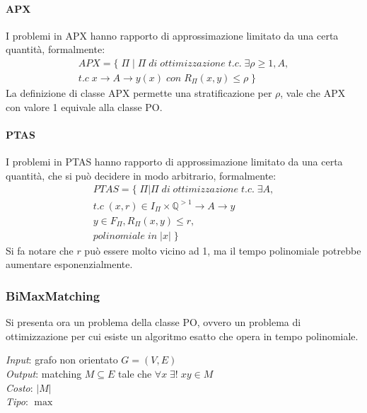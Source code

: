 \paragraph{APX}
I problemi in APX hanno rapporto di approssimazione limitato da una certa quantità, 
formalmente: 
\begin{equation}
    \begin{aligned}
        \mathit{APX} = \{\;\Pi\;|\;\Pi \mathit{\;di\;ottimizzazione\;t.c.\;}
\exists \rho \geq 1, A, \\\mathit{t.c\;} x\rightarrow A \rightarrow y(x)\;\mathit{con}\;R_\Pi(x, y) \leq \rho\;\}
    \end{aligned}
\end{equation}
La definizione di classe APX permette una stratificazione per $\rho$, vale che APX 
con valore 1 equivale alla classe PO.

\paragraph{PTAS}
I problemi in PTAS hanno rapporto di approssimazione limitato da una certa quantità,
che si può decidere in modo arbitrario, formalmente: 
\begin{equation}
    \begin{aligned}
        \mathit{PTAS} = \{\;\Pi | \Pi \mathit{\;di\;ottimizzazione\;t.c.\;}\exists A, \\
\mathit{t.c\;} (x, r) \in I_\Pi \times \mathbb{Q}^{>1} \rightarrow A \rightarrow y \\
y \in F_\Pi, R_\Pi(x, y) \leq r, \\\mathit{polinomiale\;in\;} |x|\;\}
    \end{aligned}
\end{equation}
Si fa notare che $r$ può essere molto vicino ad 1, ma il tempo polinomiale
potrebbe aumentare esponenzialmente.

\subsubsection{BiMaxMatching}
Si presenta ora un problema della classe PO, ovvero un problema di ottimizzazione
per cui esiste un algoritmo esatto che opera in tempo polinomiale.

\emph{Input}: grafo non orientato $G = (V,E)$\\
\emph{Output}: matching $M \subseteq E$ tale che $\forall x\;\exists!\;xy \in M$\\
\emph{Costo}: $|M|$\\
\emph{Tipo}: $\max$

